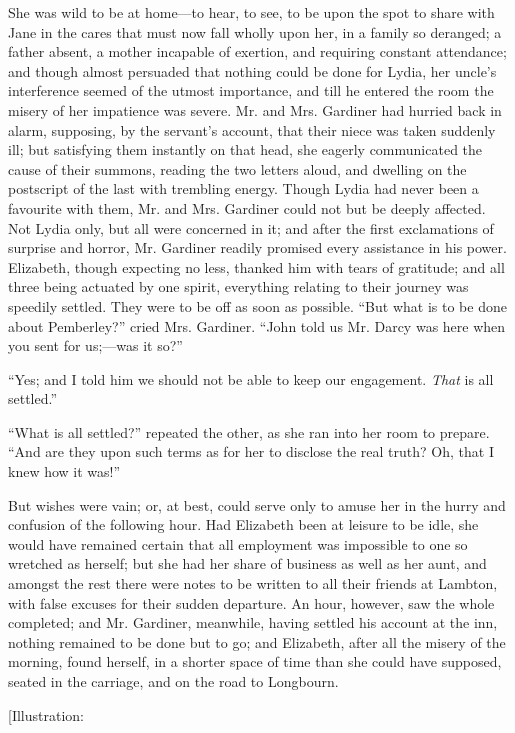 \documentclass[12pt]{book}
\begin{document}
She was wild to be at home---to hear, to see, to be upon the spot to share with Jane in the cares that must now fall wholly upon her, in a family so deranged; a father absent, a mother incapable of exertion, and requiring constant attendance; and though almost persuaded that nothing could be done for Lydia, her uncle's interference seemed of the utmost importance, and till he entered the room the misery of her impatience was severe. Mr. and Mrs. Gardiner had hurried back in alarm, supposing, by the servant's account, that their niece was taken suddenly ill; but satisfying them instantly on that head, she eagerly communicated the cause of their summons, reading the two letters aloud, and dwelling on the postscript of the last with trembling energy. Though Lydia had never been a favourite with them, Mr. and Mrs. Gardiner could not but be deeply affected. Not Lydia only, but all were concerned in it; and after the first exclamations of surprise and horror, Mr. Gardiner readily promised every assistance in his power. Elizabeth, though expecting no less, thanked him with tears of gratitude; and all three being actuated by one spirit, everything relating to their journey was speedily settled. They were to be off as soon as possible. ``But what is to be done about Pemberley?'' cried Mrs. Gardiner. ``John told us Mr. Darcy was here when you sent for us;---was it so?''

``Yes; and I told him we should not be able to keep our engagement. \textit{That} is all settled.''

``What is all settled?'' repeated the other, as she ran into her room to prepare. ``And are they upon such terms as for her to disclose the real truth? Oh, that I knew how it was!''

But wishes were vain; or, at best, could serve only to amuse her in the hurry and confusion of the following hour. Had Elizabeth been at leisure to be idle, she would have remained certain that all employment was impossible to one so wretched as herself; but she had her share of business as well as her aunt, and amongst the rest there were notes to be written to all their friends at Lambton, with false excuses for their sudden departure. An hour, however, saw the whole completed; and Mr. Gardiner, meanwhile, having settled his account at the inn, nothing remained to be done but to go; and Elizabeth, after all the misery of the morning, found herself, in a shorter space of time than she could have supposed, seated in the carriage, and on the road to Longbourn.

[Illustration:
\end{document}
